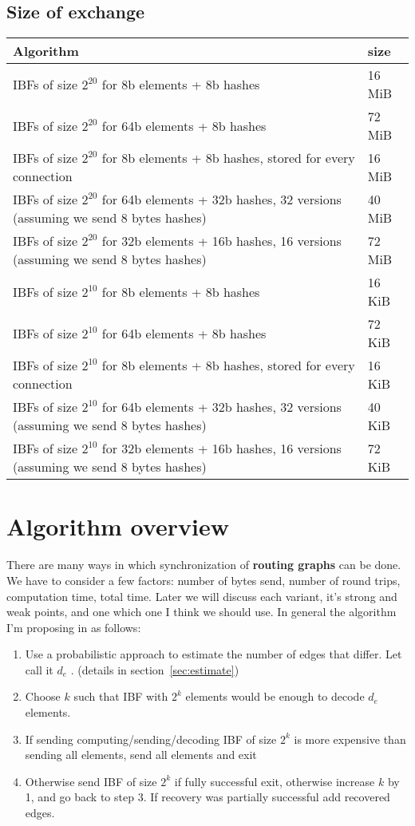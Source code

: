 \documentclass[11pt]{article}
\begin{document}
\subsection{Size of exchange }
\begin{tabular}{ | l | l | }
    \hline
    Algorithm & size \\ \hline
    IBFs of size $2^{20}$ for 8b elements + 8b hashes & 16 MiB \\
    IBFs of size $2^{20}$  for 64b elements + 8b hashes & 72 MiB \\
    IBFs of size $2^{20}$  for 8b elements + 8b hashes, stored for every connection & 16 MiB  \\
    IBFs of size $2^{20}$  for 64b elements + 32b hashes, 32 versions (assuming we send 8 bytes hashes) & 40 MiB  \\
    IBFs of size $2^{20}$  for 32b elements + 16b hashes, 16 versions (assuming we send 8 bytes hashes) & 72 MiB  \\ \hline


    IBFs of size $2^{10}$ for 8b elements + 8b hashes & 16 KiB \\
    IBFs of size $2^{10}$  for 64b elements + 8b hashes & 72 KiB \\
    IBFs of size $2^{10}$  for 8b elements + 8b hashes, stored for every connection & 16 KiB  \\
    IBFs of size $2^{10}$  for 64b elements + 32b hashes, 32 versions (assuming we send 8 bytes hashes) & 40 KiB  \\
    IBFs of size $2^{10}$  for 32b elements + 16b hashes, 16 versions (assuming we send 8 bytes hashes) & 72 KiB  \\ \hline
\end{tabular}

\section{Algorithm overview}
There are many ways in which synchronization of \textbf{routing graphs} can be done.
We have to consider a few factors: number of bytes send, number of round trips, computation time, total time.
Later we will discuss each variant, it's strong and weak points, and one which one I think we should use.
In general the algorithm I'm proposing in as follows:
\begin{enumerate}
  \item Use a probabilistic approach to estimate the number of edges that differ.
  Let call it $d_e$ . (details in section~\ref{sec:estimate})
  \item Choose $k$ such that IBF with $2^k$ elements would be enough to decode $d_e$ elements.
  \item If sending computing/sending/decoding IBF of size $2^k$ is more expensive than sending all elements, send all elements and exit
  \item Otherwise send IBF of size $2^k$ if fully successful exit, otherwise increase $k$ by 1, and go back to step 3.
 If recovery was partially successful add recovered edges.
\end{enumerate}
\end{document}
